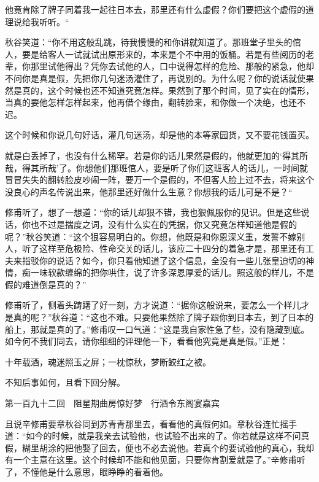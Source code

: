 \documentclass[12pt,UTF8]{ctexbook}
\begin{document}
{{{他竟肯除了牌子同着我一起往日本去，那里还有什么虚假？你们要把这个虚假的道理说给我听听。“

秋谷笑道：“你不用这般乱跳，待我慢慢的和你讲就知道了。那班堂子里头的倌人，要是给客人一试就试出原形来的，本来是个不中用的饭桶。若是有些阅历的老辈，你那里试他得出？凭你去试他的人，口中说得怎样的危险、那般的紧急，他却不问你是真是假，先把你几句迷汤灌住了，再说别的。为什么呢？你的说话就使果然是真的，这个时候也还不知道究竟怎样。果然到了那个时间，见了实在的情形，当真的要他怎样怎样起来，他再借个缘由，翻转脸来，和你做一个决绝，也还不迟。

这个时候和你说几句好话，灌几句迷汤，却是他的本等家园货，又不要花钱置买。

就是白丢掉了，也没有什么稀罕。若是你的话儿果然是假的，他就更加的‘得其所哉，得其所哉’了。你想他们那班倌人，要是听了你们这班客人的话儿，一时间就冒冒失失的翻转脸皮吵闹一阵，要万一个是假的，不但客人脸上过不去，将来这个没良心的声名传说出来，他那里还好做什么生意？你想我的话儿可是不是？“

修甫听了，想了一想道：“你的话儿却狠不错，我也狠佩服你的见识。但是这些说话，你也不过是揣度之词，没有什么实在的凭据，你又究竟怎样知道他是假的呢？”秋谷笑道：“这个狠容易明白的。你想，他既是和你恩深义重，发誓不嫁别人，听了这样至危极险、性命交关的话儿，该应二十四分的着急才是，那里还有工夫来指驳你的说话？如今，你只看他知道了这个信息，全没有一些儿张皇迫切的神情，痴一味软款缠绵的把你哄住，说了许多深恩厚爱的话儿。照这般的样儿，不是假的难道倒是真的？”

修甫听了，侧着头踌躇了好一刻，方才说道：“据你这般说来，要怎么一个样儿才是真的呢？”秋谷道：“这也不难。只要他果然除了牌子跟你到日本去，到了日本的船上，那就是真的了。”修甫叹一口气道：“这是我自家性急了些，没有隐藏到底。如今何不我们同去，请你细细的评理他一下，看看他究竟是真是假。”正是：

十年载酒，魂迷照玉之屏；一枕惊秋，梦断鲛红之被。

不知后事如何，且看下回分解。





第一百九十二回　阻星期曲房惊好梦　行酒令东阁宴嘉宾





且说辛修甫要章秋谷同到苏青青那里去，看看他的真假何如。章秋谷连忙摇手道：“如今的时候，就是我亲去试验他，也试验不出来的了。你若就是这样不问真假，糊里胡涂的把他娶了回去，便也不必去说他。若真个的要试验他的真心，我却有一个主意在这里。这个时候却不能和他见面，只要你肯割爱就是了。”辛修甫听了，不懂他是什么意思，眼睁睁的看着他。

}}}
\end{document}
